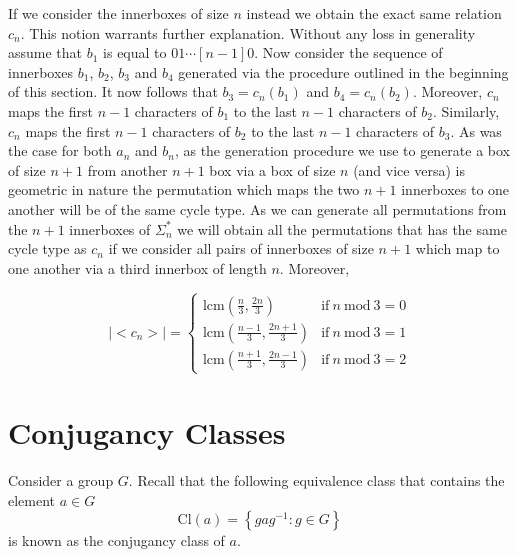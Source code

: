 \documentclass[a4paper,10pt]{article}
\begin{document}
If we consider the innerboxes of size $n$ instead we obtain the exact same relation $c_n$. This notion warrants further explanation. Without any loss in generality assume that $b_1$ is equal to $01\cdots[n-1]0$. Now consider the sequence of innerboxes $b_1$, $b_2$, $b_3$ and $b_4$ generated via the procedure outlined in the beginning of this section. It now follows that $b_3 = c_n(b_1)$ and $b_4 = c_n(b_2)$. Moreover, $c_n$ maps the first $n-1$ characters of $b_1$ to the last $n-1$ characters of $b_2$. Similarly, $c_n$ maps the first $n-1$ characters of $b_2$ to the last $n-1$ characters of $b_3$. As was the case for both $a_n$ and $b_n$, as the generation procedure we use to generate a box of size $n+1$ from another $n+1$ box via a box of size $n$ (and vice versa) is geometric in nature the permutation which maps the two $n+1$ innerboxes to one another will be of the same cycle type. As we can generate all permutations from the $n+1$ innerboxes of $\Sigma_n^*$ we will obtain all the permutations that has the same cycle type as $c_n$ if we consider all pairs of innerboxes of size $n+1$ which map to one another via a third innerbox of length $n$. Moreover,

\begin{equation}
|\!\!<\!\!c_n\!\!>\!\!|= \left\{
\begin{array}{ll}
\textrm{lcm}(\frac{n}{3},\frac{2n}{3}) &\textrm{if}~n~\textrm{mod}~3=0\\
\textrm{lcm}(\frac{n-1}{3},\frac{2n+1}{3}) &\textrm{if}~n~\textrm{mod}~3=1\\
\textrm{lcm}(\frac{n+1}{3},\frac{2n-1}{3}) &\textrm{if}~n~\textrm{mod}~3=2
\end{array}
\right.
\end{equation}

\section{Conjugancy Classes}
Consider a group $G$. Recall that the following equivalence class that contains the element $a\in G$
\begin{equation}
 \textrm{Cl} (a)=\left\{gag^{-1}:g\in G\right\}
\end{equation}
is known as the conjugancy class of $a$. 
\end{document}
